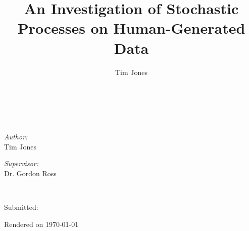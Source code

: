 \begin{titlepage}
\title{An Investigation of Stochastic Processes on Human-Generated Data}
\author{Tim Jones}

\\[1.5cm]

\\[1.5cm]

\begin{minipage}{0.4\textwidth}
\begin{flushleft} \large
\emph{Author:}\\
Tim Jones
\end{flushleft}
\end{minipage}
\begin{minipage}{0.4\textwidth}
\begin{flushright} \large
\emph{Supervisor:} \\
Dr. Gordon Ross
\end{flushright}
\end{minipage}\\[1.5cm]

\vfill

\begin{minipage}{0.4\textwidth}
Submitted: \dotfill
\end{minipage}

\vfill

Rendered on \today


\end{titlepage}